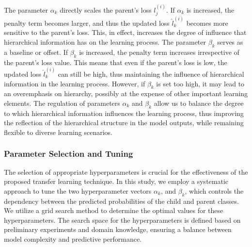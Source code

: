 \documentclass[review,1p,times,numbers]{elsarticle}
\begin{document}
The parameter $\alpha _k$ directly scales the parent's loss $l_j^{(i)}$. If $\alpha _k$ is increased, the penalty term becomes larger, and thus the updated loss $\widehat{l}_k^{(i)}$ becomes more sensitive to the parent's loss. This, in effect, increases the degree of influence that hierarchical information has on the learning process. The parameter $\beta_k$ serves as a baseline or offset. If $\beta_k$ is increased, the penalty term increases irrespective of the parent's loss value. This means that even if the parent's loss is low, the updated loss $\widehat{l}_k^{(i)}$ can still be high, thus maintaining the influence of hierarchical information in the learning process. However, if $\beta_k$ is set too high, it may lead to an overemphasis on hierarchy, possibly at the expense of other important learning elements. The regulation of parameters $\alpha_k$ and $\beta_k$ allow us to balance the degree to which hierarchical information influences the learning process, thus improving the reflection of the hierarchical structure in the model outputs, while remaining flexible to diverse learning scenarios.

\subsubsection{Parameter Selection and Tuning}
The selection of appropriate hyperparameters is crucial for the effectiveness of the proposed transfer learning technique. In this study, we employ a systematic approach to tune the two hyperparameter vectors $\alpha_k $, and $\beta_k$, which controls the dependency between the predicted probabilities of the child and parent classes. We utilize a grid search method to determine the optimal values for these hyperparameters. The search space for the hyperparameters is defined based on preliminary experiments and domain knowledge, ensuring a balance between model complexity and predictive performance.
\end{document}
